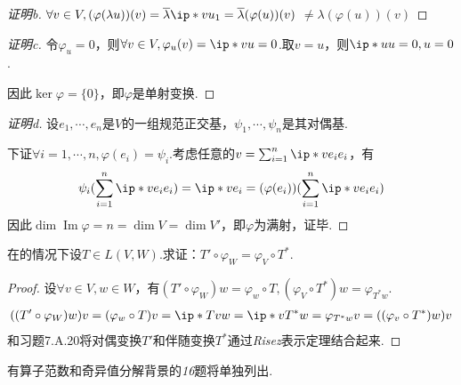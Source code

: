 \begin{proof}[证明b]
    \(\forall v \in V,(\varphi(\lambda u))(v)=\ol{\lambda}\ip*{v}{u_1}=\ol{\lambda} (\varphi(u))(v)\)
    \(\ne \lambda (\varphi(u))(v)\)
\end{proof}

\begin{proof}[证明c]
    令\(\varphi_u=0\)，则\(\forall v \in V,\varphi_u(v)=\ip*{v}{u}=0\).取\(v=u\)，则\(\ip*{u}{u}=0,u=0\).

    因此\(\ker \varphi=\{0\}\)，即\(\varphi\)是单射变换.
\end{proof}

\begin{proof}[证明d]
    设\(e_1,\cdots,e_n\)是\(V\)的一组规范正交基，\(\psi_1,\cdots,\psi_n\)是其对偶基.

    下证\(\forall i=1,\cdots,n,\varphi(e_i)=\psi_i\).考虑任意的\(v=\sum_{i=1}^n \ip*{v}{e_i}e_i\)，有
    \begin{align*}
        \psi_i(\sum_{i=1}^n \ip*{v}{e_i}e_i)=\ip*{v}{e_i}=(\varphi(e_i))(\sum_{i=1}^n \ip*{v}{e_i}e_i)
    \end{align*}
    因此\(\dim \operatorname{Im} \varphi=n=\dim V=\dim V'\)，即\(\varphi\)为满射，证毕.
\end{proof}

\begin{problem}[7.A.20]
    在的情况下设\(T \in L(V,W)\).求证：\(T' \circ \varphi_W=\varphi_V \circ T^*\).
\end{problem}

\begin{proof}
    设\(\forall v \in V,w \in W\)，有\((T' \circ \varphi_W)w=\varphi_w \circ T,(\varphi_V \circ T^*)w=\varphi_{T^*w}\).
    \begin{align*}
        ((T' \circ \varphi_W)w)v=(\varphi_w \circ T)v=\ip*{Tv}{w}=\ip*{v}{T^*w}=\varphi_{T^*w}v=((\varphi_v \circ T^*)w)v
    \end{align*}
    {\kaishu {}和习题7.A.20将对偶变换\(T'\)和伴随变换\(T^*\)通过\textit{Risez}表示定理结合起来.}
    
\end{proof}

{\kaishu 有算子范数和奇异值分解背景的\textit{16}题将单独列出.}

